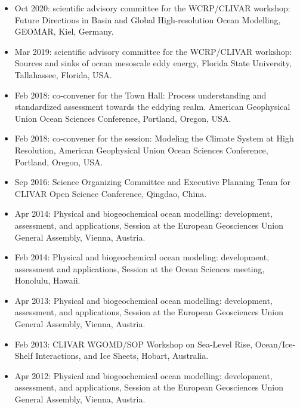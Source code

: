 \documentclass{article}
\begin{document}
\begin{itemize}[leftmargin=*]

\item Oct 2020: scientific advisory committee for the WCRP/CLIVAR workshop: Future Directions in Basin and Global High-resolution Ocean Modelling, GEOMAR, Kiel, Germany.

\item Mar 2019: scientific advisory committee for the WCRP/CLIVAR workshop: Sources and sinks of ocean mesoscale eddy energy, Florida State University, Tallahassee, Florida, USA. 

\item Feb 2018: co-convener for the Town Hall: Process understanding and standardized assessment towards the eddying realm. {\sc American Geophysical Union Ocean Sciences Conference}, Portland, Oregon, USA.

\item Feb 2018: co-convener for the session: Modeling the Climate System at High Resolution, {\sc American Geophysical Union Ocean Sciences Conference}, Portland, Oregon, USA.

\item Sep 2016: Science Organizing Committee and Executive Planning Team for {\sc CLIVAR Open Science Conference}, Qingdao, China.

\item Apr 2014: {\sc Physical and biogeochemical ocean modelling: development, assessment, and applications}, Session at the European Geosciences Union General Assembly, Vienna, Austria.

\item Feb 2014: {\sc Physical and biogeochemical ocean modeling: development, assessment and applications}, Session at the Ocean Sciences meeting, Honolulu, Hawaii.

\item Apr 2013: {\sc Physical and biogeochemical ocean modelling: development, assessment, and applications}, Session at the European Geosciences Union General Assembly, Vienna, Austria.

\item Feb 2013: {\sc CLIVAR WGOMD/SOP Workshop on Sea-Level Rise, Ocean/Ice-Shelf Interactions, and Ice Sheets}, Hobart, Australia.  

\item Apr 2012: {\sc Physical and biogeochemical ocean modelling:
  development, assessment, and applications}, Session at the European
Geosciences Union General Assembly, Vienna, Austria.


\end{itemize}
\end{document}
